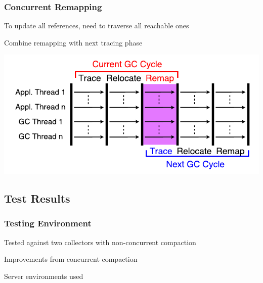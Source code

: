 \documentclass{beamer}
\newcommand{\linespace}{\vskip 0.25cm}
\begin{document}
\begin{frame}

\frametitle{Concurrent Remapping}

To update all references, need to traverse all reachable ones

\linespace
\linespace

Combine remapping with next tracing phase

\begin{center}
\includegraphics[width=.8\textwidth]{Illustrations/c4Mapping_rough_figure_5.pdf}
\end{center}

\end{frame}



\subsection*{Test Results}

\begin{frame}

\frametitle{Testing Environment}

Tested against two collectors with non-concurrent compaction

\linespace
\linespace

Improvements from concurrent compaction

\linespace
\linespace

Server environments used

\end{frame}
\end{document}
